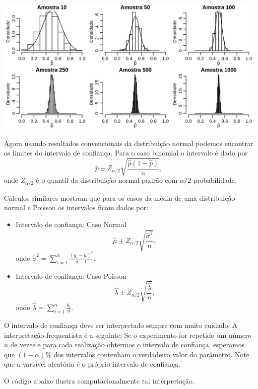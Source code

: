 \documentclass[10pt,a4paper]{book}
\begin{document}
\begin{center}\includegraphics[width=0.99\linewidth]{figures/unnamed-chunk-383-1} \end{center}

Agora usando resultados convencionais da distribuição normal podemos
encontrar os limites do intervalo de confiança. Para o caso binomial o
intervalo é dado por
\[\hat{p} \pm Z_{\alpha/2} \sqrt{\frac{\hat{p}(1-\hat{p})}{n}},\] onde
\(Z_{\alpha/2}\) é o quantil da distribuição normal padrão com
\(\alpha/2\) probabilidade.

Cálculos similares mostram que para os casos da média de uma
distribuição normal e Poisson os intervalos ficam dados por:

\begin{itemize}
\item
  Intervalo de confiança: Caso Normal
  \[\hat{\mu} \pm Z_{\alpha/2} \sqrt{\frac{\hat{\sigma}^2}{n}},\] onde
  \(\hat{\sigma}^2 = \sum_{i=1}^n \frac{(y_i - \hat{\mu})^2}{n-1}\).
\item
  Intervalo de confiança: Caso Poisson
  \[\hat{\lambda} \pm Z_{\alpha/2} \sqrt{\frac{\hat{\lambda}}{n}},\]
  onde \(\hat{\lambda} = \sum_{i=1}^n \frac{y_i}{n}.\)
\end{itemize}

O intervalo de confiança deve ser interpretado sempre com muito cuidado.
A interpretação frequentista é a seguinte: Se o experimento for repetido
um número \(n\) de vezes e para cada realização obtermos o intervalo de
confiança, esperamos que \((1-\alpha)\%\) dos intervalos contenham o
verdadeiro valor do parâmetro. Note que a variável aleatória é o próprio
intervalo de confiança.

O código abaixo ilustra computacionalmente tal interpretação.
\end{document}
